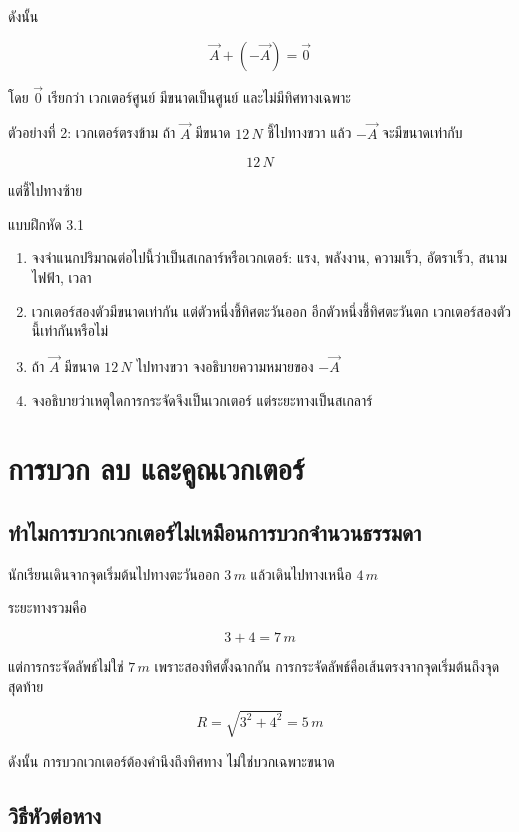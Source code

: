 ดังนั้น

\[
\vec{A}+(-\vec{A})=\vec{0}
\]

โดย $\vec{0}$ เรียกว่า เวกเตอร์ศูนย์ มีขนาดเป็นศูนย์ และไม่มีทิศทางเฉพาะ

\begin{examplebox}{ตัวอย่างที่ 2: เวกเตอร์ตรงข้าม}
ถ้า $\vec{A}$ มีขนาด $12\,\si{N}$ ชี้ไปทางขวา แล้ว $-\vec{A}$ จะมีขนาดเท่ากับ

\[
12\,\si{N}
\]

แต่ชี้ไปทางซ้าย
\end{examplebox}

\begin{exercisebox}{แบบฝึกหัด 3.1}
\begin{enumerate}
    \item จงจำแนกปริมาณต่อไปนี้ว่าเป็นสเกลาร์หรือเวกเตอร์: แรง, พลังงาน, ความเร็ว, อัตราเร็ว, สนามไฟฟ้า, เวลา
    \item เวกเตอร์สองตัวมีขนาดเท่ากัน แต่ตัวหนึ่งชี้ทิศตะวันออก อีกตัวหนึ่งชี้ทิศตะวันตก เวกเตอร์สองตัวนี้เท่ากันหรือไม่
    \item ถ้า $\vec{A}$ มีขนาด $12\,\si{N}$ ไปทางขวา จงอธิบายความหมายของ $-\vec{A}$
    \item จงอธิบายว่าเหตุใดการกระจัดจึงเป็นเวกเตอร์ แต่ระยะทางเป็นสเกลาร์
\end{enumerate}
\end{exercisebox}

\section{การบวก ลบ และคูณเวกเตอร์}

\subsection{ทำไมการบวกเวกเตอร์ไม่เหมือนการบวกจำนวนธรรมดา}

นักเรียนเดินจากจุดเริ่มต้นไปทางตะวันออก $3\,\si{m}$ แล้วเดินไปทางเหนือ $4\,\si{m}$

ระยะทางรวมคือ

\[
3+4=7\,\si{m}
\]

แต่การกระจัดลัพธ์ไม่ใช่ $7\,\si{m}$ เพราะสองทิศตั้งฉากกัน การกระจัดลัพธ์คือเส้นตรงจากจุดเริ่มต้นถึงจุดสุดท้าย

\[
R=\sqrt{3^2+4^2}=5\,\si{m}
\]

ดังนั้น การบวกเวกเตอร์ต้องคำนึงถึงทิศทาง ไม่ใช่บวกเฉพาะขนาด

\subsection{วิธีหัวต่อหาง}

